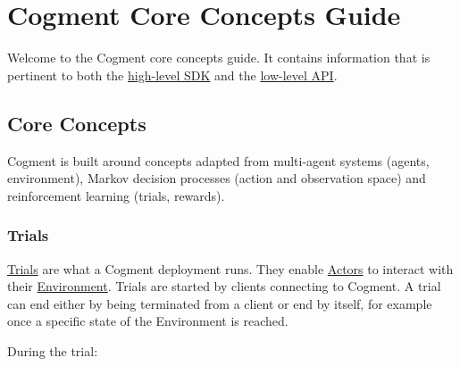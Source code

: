 \hypertarget{cogment-core-concepts-guide}{%
\section{Cogment Core Concepts
Guide}\label{cogment-core-concepts-guide}}

Welcome to the Cogment core concepts guide. It contains information that
is pertinent to both the
\href{../cogment/cogment-api-guide.md}{high-level SDK} and the
\href{../cogment/cogment-low-level-api-guide/overview.md}{low-level
API}.

\hypertarget{core-concepts}{%
\subsection{Core Concepts}\label{core-concepts}}

Cogment is built around concepts adapted from multi-agent systems
(agents, environment), Markov decision processes (action and observation
space) and reinforcement learning (trials, rewards).

\hypertarget{trials}{%
\subsubsection{Trials}\label{trials}}

\href{./glossary.md\#trial}{Trials} are what a Cogment deployment runs.
They enable \href{./glossary.md\#actors}{Actors} to interact with their
\href{./glossary.md\#environment}{Environment}. Trials are started by
clients connecting to Cogment. A trial can end either by being
terminated from a client or end by itself, for example once a specific
state of the Environment is reached.

During the trial:

